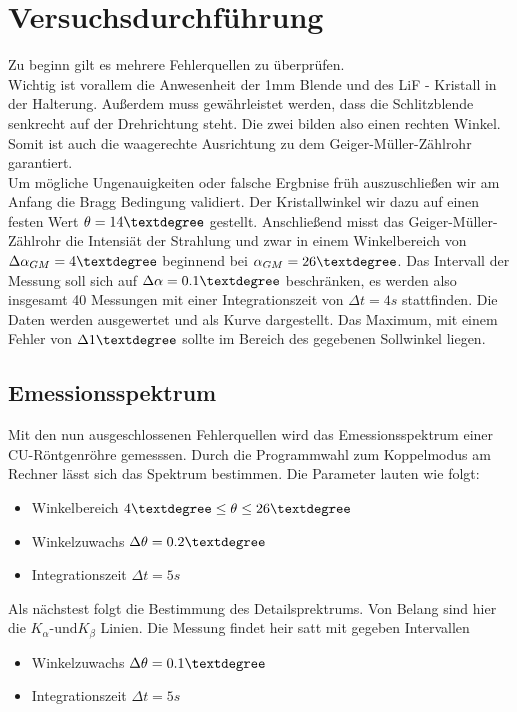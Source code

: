 \section{Versuchsdurchführung}
Zu beginn gilt es mehrere Fehlerquellen zu überprüfen. \\
Wichtig ist vorallem die Anwesenheit der 1mm Blende und des LiF - Kristall in der Halterung.
Außerdem muss gewährleistet werden, dass die Schlitzblende senkrecht auf der Drehrichtung steht. Die zwei bilden also einen rechten Winkel.
Somit ist auch die waagerechte Ausrichtung zu dem Geiger-Müller-Zählrohr garantiert. %
\\
\newline
Um mögliche Ungenauigkeiten oder falsche Ergbnise früh auszuschließen wir am Anfang die Bragg Bedingung %
validiert. Der Kristallwinkel wir dazu auf einen festen Wert $\theta = 14 \textdegree $  gestellt.
Anschließend misst das Geiger-Müller-Zählrohr die Intensiät der Strahlung und zwar in einem Winkelbereich von 
$\Delta \alpha_{GM} = 4 \textdegree$ beginnend bei $\alpha_{GM} = 26 \textdegree$. Das Intervall der Messung soll sich 
auf $\Delta \alpha = 0.1 \textdegree$ beschränken, es werden also insgesamt 40 Messungen mit einer Integrationszeit von $\Delta t = 4 \si{s}$ stattfinden. 
Die Daten werden ausgewertet und als Kurve dargestellt. Das Maximum, mit einem Fehler von $\Delta 1\textdegree$ sollte im Bereich des gegebenen Sollwinkel liegen.
\\
\newline
\subsection{Emessionsspektrum}
Mit den nun ausgeschlossenen Fehlerquellen wird das Emessionsspektrum einer CU-Röntgenröhre gemesssen.
Durch die Programmwahl zum Koppelmodus am Rechner lässt sich das Spektrum bestimmen.
Die Parameter lauten wie folgt:
\begin{itemize}
    \item{Winkelbereich   $4 \textdegree \leq \theta \leq 26 \textdegree $}
    \item{Winkelzuwachs $\Delta \theta = 0.2 \textdegree$}
    \item{Integrationszeit $\Delta t = 5 \si{s}$}
\end{itemize}
Als nächstest folgt die Bestimmung des Detailsprektrums. Von Belang sind hier die $K_{\alpha} \text{-und} K_{\beta}$ Linien. 
Die Messung findet heir satt mit gegeben Intervallen
\begin{itemize}
    \item{Winkelzuwachs $\Delta \theta = 0.1 \textdegree$}
    \item{Integrationszeit $\Delta t = 5 \si{s}$}
\end{itemize}


